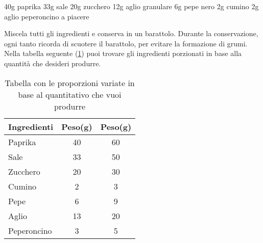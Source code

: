 \label{rub:magic-dust}
\serves{-}
\cooktime{-}
\begin{ingreds}
	40g paprika
	33g sale
	20g zucchero
	12g aglio granulare
	6g pepe nero
	2g cumino
	2g aglio
	peperoncino a piacere

\end{ingreds}

\begin{method}
	Miscela tutti gli ingredienti e conserva in un barattolo. Durante la conservazione, ogni tanto ricorda di scuotere il barattolo, per evitare la formazione di grumi. Nella tabella seguente (\ref{magicdust-proporzioni}) puoi trovare gli ingredienti porzionati in base alla quantità che desideri produrre.
	\begin{table}[h]
	\begin{center}
\begin{tabular}{lcc}
\toprule
	Ingredienti	&	Peso(g)	&	Peso(g)\\
\midrule
	Paprika		&	40	&	60	\\
	Sale			&	33	&	50	\\
	Zucchero		&	20	&	30	\\
	Cumino		&	2	&	3	\\
	Pepe			&	6	&	9	\\
	Aglio		&	13	&	20	\\
	Peperoncino	&	3	&	5	\\
\bottomrule
\end{tabular}
	\caption{Tabella con le proporzioni variate in base al quantitativo che vuoi produrre}
		\label{magicdust-proporzioni}
	\end{center}
\end{table}
\end{method}



